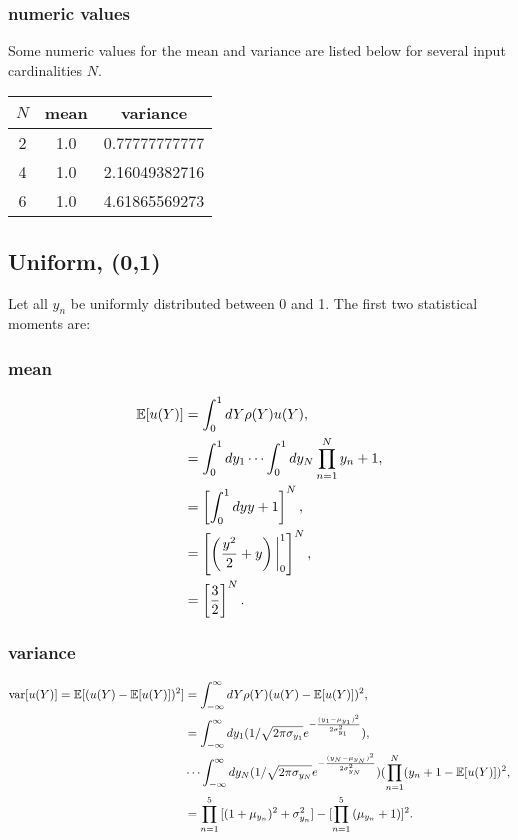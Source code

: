 \subsubsection{numeric values}
Some numeric values for the mean and variance are listed below for several input cardinalities $N$.
\begin{table}[h!]
  \centering
  \begin{tabular}{c|c|c}
    $N$ & mean & variance \\ \hline
    2 & 1.0 & 0.77777777777 \\
    4 & 1.0 & 2.16049382716 \\
    6 & 1.0 & 4.61865569273
  \end{tabular}
\end{table}

\subsection{Uniform, (0,1)}
Let all $y_n$ be uniformly distributed between 0 and 1.  The first two statistical moments are:

\subsubsection{mean}
\begin{align}
\mathbb{E}[ u(Y)] &=\int_{0}^1 dY \rho(Y)u(Y),\\
  &=\int_{0}^1 dy_1\cdots\int_{0}^1 dy_N \prod_{n=1}^N y_n+1,\\
  &=\left[ \int_{0}^1 dy y+1\right]^N,\\
  &=\left[\left(\frac{y^2}{2}+y\right)\bigg|_{0}^1\right]^N,\\
  &=\left[\frac{3}{2}\right]^N.
\end{align}

\subsubsection{variance}
\begin{align}
\text{var}[u(Y)]=\mathbb{E}[ (u(Y)-\mathbb{E}[ u(Y)])^2] &= \int_{-\infty}^\infty dY \rho(Y)(u(Y)-\mathbb{E}[ u(Y)])^2,\notag \\
  &=\int_{-\infty}^\infty dy_1 (1/\sqrt{2 \pi \sigma_{y_1}}e^{-\frac{(y_1-\mu_{y_1})^2}{2\sigma_{y_1}^2}}), \notag \\
  &\cdots\int_{-\infty}^\infty dy_N  (1/\sqrt{2 \pi \sigma_{y_N}}e^{-\frac{(y_N-\mu_{y_N})^2}{2\sigma_{y_N}^2}})(\prod_{n=1}^N (y_n+1-\mathbb{E}[ u(Y)])^2,\\
  &=\prod_{n=1}^5{[(1+\mu_{y_n})^2+\sigma_{y_n}^2]} - [\prod_{n=1}^5{(\mu_{y_n}+1)}]^2. \notag
\end{align}
